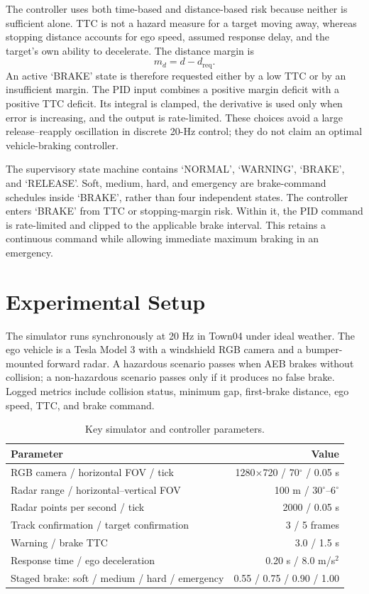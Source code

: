 \documentclass[conference]{IEEEtran}
\begin{document}
The controller uses both time-based and distance-based risk because neither is
sufficient alone. TTC is not a hazard measure for a target moving away, whereas
stopping distance accounts for ego speed, assumed response delay, and the
target's own ability to decelerate. The distance margin is
\begin{equation}
m_d=d-d_\mathrm{req}.
\label{eq:margin}
\end{equation}
An active `BRAKE' state is therefore requested either by a low TTC or by an
insufficient margin. The PID input combines a positive margin deficit with a
positive TTC deficit. Its integral is clamped, the derivative is used only when
error is increasing, and the output is rate-limited. These choices avoid a large
release--reapply oscillation in discrete 20-Hz control; they do not claim an
optimal vehicle-braking controller.

The supervisory state machine contains `NORMAL', `WARNING', `BRAKE', and
`RELEASE'. Soft, medium, hard, and emergency are brake-command schedules inside
`BRAKE', rather than four independent states. The controller enters `BRAKE' from
TTC or stopping-margin risk. Within it, the PID command is rate-limited and
clipped to the applicable brake interval. This retains a continuous command
while allowing immediate maximum braking in an emergency.

\section{Experimental Setup}
The simulator runs synchronously at 20 Hz in Town04 under ideal weather. The ego
vehicle is a Tesla Model 3 with a windshield RGB camera and a bumper-mounted
forward radar. A hazardous scenario passes when AEB brakes without collision;
a non-hazardous scenario passes only if it produces no false brake. Logged
metrics include collision status, minimum gap, first-brake distance, ego speed,
TTC, and brake command.

\begin{table}[t]
\caption{Key simulator and controller parameters.}
\label{tab:config}
\centering
\footnotesize
\begin{tabular}{p{}r}
\toprule
Parameter & Value \\
\midrule
RGB camera / horizontal FOV / tick & 1280$\times$720 / 70$^\circ$ / 0.05 s \\
Radar range / horizontal--vertical FOV & 100 m / 30$^\circ$--6$^\circ$ \\
Radar points per second / tick & 2000 / 0.05 s \\
Track confirmation / target confirmation & 3 / 5 frames \\
Warning / brake TTC & 3.0 / 1.5 s \\
Response time / ego deceleration & 0.20 s / 8.0 m/s$^2$ \\
Staged brake: soft / medium / hard / emergency & 0.55 / 0.75 / 0.90 / 1.00 \\
\bottomrule
\end{tabular}
\end{table}
\end{document}
